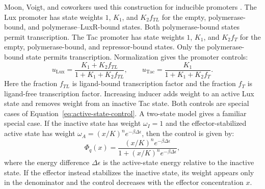 Moon, Voigt, and coworkers used this construction for inducible promoters
\cite{Moon2012}. The Lux promoter has state weights $1$, $K_1$, and
$K_2f_{TL}$ for the empty, polymerase-bound, and polymerase--LuxR-bound
states. Both polymerase-bound states permit transcription. The Tac promoter
has state weights $1$, $K_1$, and $K_2f_T$ for the empty, polymerase-bound, and
repressor-bound states. Only the polymerase-bound state permits
transcription. Normalization gives the promoter controls:
\begin{equation}\label{eq:moon-promoter-control}
  u_{\mathrm{Lux}}
    = \frac{K_1+K_2f_{TL}}{1+K_1+K_2f_{TL}},
  \qquad
  u_{\mathrm{Tac}}
    = \frac{K_1}{1+K_1+K_2f_T}.
\end{equation}
Here the fraction $f_{TL}$ is ligand-bound transcription factor and the
fraction $f_T$ is ligand-free transcription factor. Increasing inducer adds
weight to an active Lux state and removes weight from an inactive Tac state. Both controls are
special cases of Equation~\eqref{eq:active-state-control}. A two-state model
gives a familiar special case. If the inactive state has
weight $\omega_I=1$ and the effector-stabilized active state has weight
$\omega_A=(x/K)^n e^{-\beta\Delta\epsilon}$, then the control is given by:
\begin{equation}\label{eq:two-state-control}
  \Phi_q(x)
    = \frac{(x/K)^n e^{-\beta\Delta\epsilon}}
      {1+(x/K)^n e^{-\beta\Delta\epsilon}},
\end{equation}
where the energy difference $\Delta\epsilon$ is the active-state energy
relative to the inactive state. If the effector instead stabilizes the inactive state, its weight
appears only in the denominator and the control decreases with the effector
concentration $x$.

